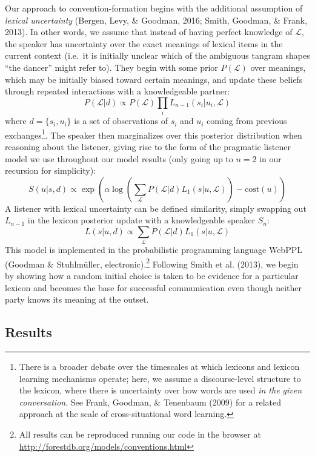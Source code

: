 \documentclass[manuscript]{stjour}
\begin{document}
Our approach to convention-formation begins with the additional
assumption of \emph{lexical uncertainty} (Bergen, Levy, \& Goodman,
2016; Smith, Goodman, \& Frank, 2013). In other words, we assume that
instead of having perfect knowledge of \(\mathcal{L}\), the speaker has
uncertainty over the exact meanings of lexical items in the current
context (i.e.~it is initially unclear which of the ambiguous tangram
shapes ``the dancer'' might refer to). They begin with some prior
\(P(\mathcal{L})\) over meanings, which may be initially biased toward
certain meanings, and update these beliefs through repeated interactions
with a knowledgeable partner:
\[P(\mathcal{L} | d) \propto P(\mathcal{L})\prod_i L_{n-1}(s_i|u_i, \mathcal{L})\]
where \(d = \{s_i, u_i\}\) is a set of observations of \(s_i\) and
\(u_i\) coming from previous exchanges\footnote{There is a broader
  debate over the timescales at which lexicons and lexicon learning
  mechanisms operate; here, we assume a discourse-level structure to the
  lexicon, where there is uncertainty over how words are used \emph{in
  the given conversation}. See Frank, Goodman, \& Tenenbaum (2009) for a
  related approach at the scale of cross-situational word learning.}.
The speaker then marginalizes over this posterior distribution when
reasoning about the listener, giving rise to the form of the pragmatic
listener model we use throughout our model results (only going up to
\(n = 2\) in our recursion for simplicity):
\[S(u | s, d) \propto \exp( \alpha\log\left(\sum_{\mathcal{L}} P(\mathcal{L} | d) L_1(s | u, \mathcal{L})\right) - \textrm{cost}(u) )\]
\indent A listener with lexical uncertainty can be defined similarity,
simply swapping out \(L_{n-1}\) in the lexicon posterior update with a
knowledgeable speaker \(S_{n}\):
\[L(s | u, d) \propto \sum_\mathcal{L}P(\mathcal{L}|d)L_1(s|u,\mathcal{L})\]
\indent This model is implemented in the probabilistic programming
language WebPPL (Goodman \& Stuhlmüller, electronic).\footnote{All
  results can be reproduced running our code in the browser at
  \url{http://forestdb.org/models/conventions.html}} Following Smith et
al. (2013), we begin by showing how a random initial choice is taken to
be evidence for a particular lexicon and becomes the base for successful
communication even though neither party knows its meaning at the outset.

\subsection{Results}\label{results-1}
\end{document}
